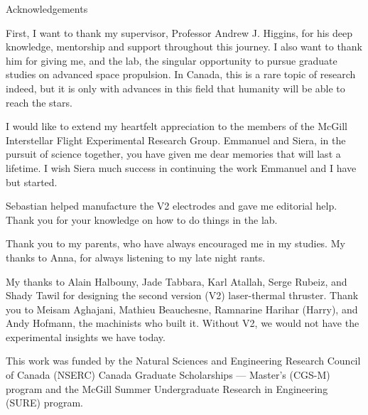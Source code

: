 \begin{plainchp}{Acknowledgements}

    First, I want to thank my supervisor, Professor Andrew J. Higgins, for his deep knowledge, mentorship and support throughout this journey. I also want to thank him for giving me, and the lab, the singular opportunity to pursue graduate studies on advanced space propulsion. In Canada, this is a rare topic of research indeed, but it is only with advances in this field that humanity will be able to reach the stars.

    I would like to extend my heartfelt appreciation to the members of the McGill Interstellar Flight Experimental Research Group. Emmanuel and Siera, in the pursuit of science together, you have given me dear memories that will last a lifetime. I wish Siera much success in continuing the work Emmanuel and I have but started.

    Sebastian helped manufacture the V2 electrodes and gave me editorial help. Thank you for your knowledge on how to do things in the lab.
    
    Thank you to my parents, who have always encouraged me in my studies. My thanks to Anna, for always listening to my late night rants.

    My thanks to Alain Halbouny, Jade Tabbara, Karl Atallah, Serge Rubeiz, and Shady Tawil for designing the second version (V2) laser-thermal thruster. Thank you to Meisam Aghajani, Mathieu Beauchesne, Ramnarine Harihar (Harry), and Andy Hofmann, the machinists who built it. Without V2, we would not have the experimental insights we have today.

    This work was funded by the Natural Sciences and Engineering Research Council of Canada (NSERC) Canada Graduate Scholarships — Master’s (CGS-M) program and the McGill Summer Undergraduate Research in Engineering (SURE) program.

\end{plainchp}